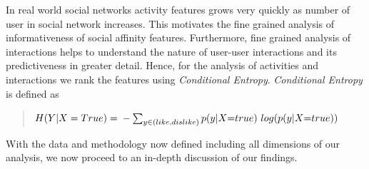 In real world social networks activity features grows very quickly as number of user in social network increases. This motivates the fine grained
analysis of informativeness of social affinity features. Furthermore, fine grained analysis of interactions helps to understand the nature of user-user 
interactions and its predictiveness in greater detail. Hence, for the analysis of activities and interactions we rank the features using
\textit{Conditional Entropy}. 
\textit{Conditional Entropy} is defined as
\begin{quote}
\begin{math}
H(Y|X=True) = \\-\sum_{y\in{(like,dislike)}} p(y|X$=$true)$ $log( p(y|X$=$true))
\end{math}
\end{quote}

With the data and methodology now defined including all dimensions of our analysis, we now proceed to an in-depth discussion of our findings.





 





